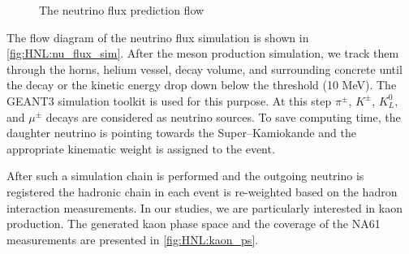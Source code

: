\documentclass[../main.tex]{subfiles}
\begin{document}
\begin{figure}[!ht]
    \centering

    \caption{The neutrino flux prediction flow}
    \label{fig:HNL:nu_flux_sim}
\end{figure}

The flow diagram of the neutrino flux simulation is shown in \autoref{fig:HNL:nu_flux_sim}. After the meson production simulation, we track them through the horns, helium vessel, decay volume, and surrounding concrete until the decay or the kinetic energy drop down below the threshold (10 MeV). The GEANT3 simulation toolkit is used for this purpose. At this step $\pi^\pm$, $K^\pm$, $K_L^0$, and $\mu^\pm$ decays are considered as neutrino sources. To save computing time, the daughter neutrino is pointing towards the Super--Kamiokande and the appropriate kinematic weight is assigned to the event.

After such a simulation chain is performed and the outgoing neutrino is registered the hadronic chain in each event is re-weighted based on the hadron interaction measurements. In our studies, we are particularly interested in kaon production. The generated kaon phase space and the coverage of the NA61 measurements are presented in \autoref{fig:HNL:kaon_ps}.
\end{document}
